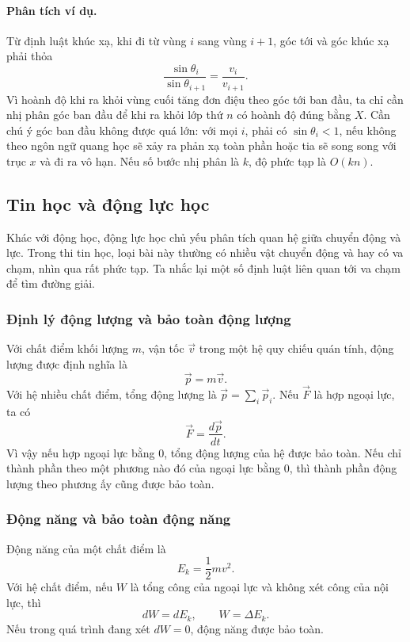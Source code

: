 \documentclass[11pt]{article}
\begin{document}
\paragraph{Phân tích ví dụ.}
Từ định luật khúc xạ, khi đi từ vùng \(i\) sang vùng \(i+1\), góc tới và góc
khúc xạ phải thỏa
\[
  \frac{\sin\theta_i}{\sin\theta_{i+1}}=\frac{v_i}{v_{i+1}}.
\]
Vì hoành độ khi ra khỏi vùng cuối tăng đơn điệu theo góc tới ban đầu, ta chỉ
cần nhị phân góc ban đầu để khi ra khỏi lớp thứ \(n\) có hoành độ đúng bằng
\(X\). Cần chú ý góc ban đầu không được quá lớn: với mọi \(i\), phải có
\(\sin\theta_i<1\), nếu không theo ngôn ngữ quang học sẽ xảy ra phản xạ toàn
phần hoặc tia sẽ song song với trục \(x\) và đi ra vô hạn. Nếu số bước nhị phân
là \(k\), độ phức tạp là \(O(kn)\).

\subsection{Tin học và động lực học}

Khác với động học, động lực học chủ yếu phân tích quan hệ giữa chuyển động và
lực. Trong thi tin học, loại bài này thường có nhiều vật chuyển động và hay có
va chạm, nhìn qua rất phức tạp. Ta nhắc lại một số định luật liên quan tới va
chạm để tìm đường giải.

\subsubsection{Định lý động lượng và bảo toàn động lượng}

Với chất điểm khối lượng \(m\), vận tốc \(\vec v\) trong một hệ quy chiếu quán
tính, động lượng được định nghĩa là
\[
  \vec p=m\vec v.
\]
Với hệ nhiều chất điểm, tổng động lượng là \(\vec p=\sum_i\vec p_i\). Nếu
\(\vec F\) là hợp ngoại lực, ta có
\[
  \vec F=\frac{d\vec p}{dt}.
\]
Vì vậy nếu hợp ngoại lực bằng \(0\), tổng động lượng của hệ được bảo toàn. Nếu
chỉ thành phần theo một phương nào đó của ngoại lực bằng \(0\), thì thành phần
động lượng theo phương ấy cũng được bảo toàn.

\subsubsection{Động năng và bảo toàn động năng}

Động năng của một chất điểm là
\[
  E_k=\frac12mv^2.
\]
Với hệ chất điểm, nếu \(W\) là tổng công của ngoại lực và không xét công của nội
lực, thì
\[
  dW=dE_k,\qquad W=\Delta E_k.
\]
Nếu trong quá trình đang xét \(dW=0\), động năng được bảo toàn.
\end{document}
